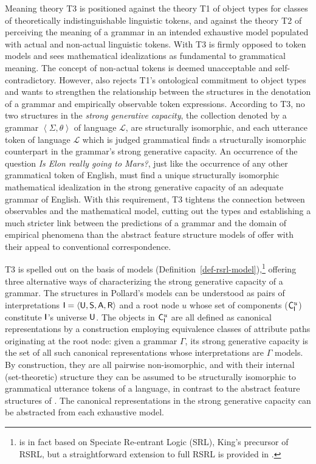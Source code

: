 \documentclass[output=paper
                ,modfonts
                ,nonflat
	        ,collection
	        ,collectionchapter
	        ,collectiontoclongg
 	        ,biblatex
                ,babelshorthands
                ,newtxmath
                ,draftmode
                ,colorlinks, citecolor=brown
]{./langsci/langscibook}
\begin{document}
{{Meaning theory T3 is positioned against the theory T1 of object types
for classes of theoretically indistinguishable linguistic tokens, and
against the theory T2 of perceiving the meaning of a grammar in an
intended exhaustive model populated with actual and non-actual
linguistic tokens.  With T3 \cite{Pollard99a} is firmly opposed to
token models and sees mathematical idealizations as fundamental to
grammatical meaning.  The concept of non-actual tokens is deemed
unacceptable and self-contradictory. However, \cite{Pollard99a} also
rejects T1's ontological commitment to object types and wants to
strengthen the relationship between the structures in the denotation
of a grammar and empirically observable token expressions.  According
to T3, no two structures in the \emph{strong generative capacity}, the
collection denoted by a grammar $\left< \Sigma, \theta\right>$ of
language $\mathcal{L}$, are
structurally isomorphic, and each utterance token of language
$\mathcal{L}$ which is judged grammatical finds a structurally
isomorphic counterpart in the grammar's strong generative capacity.
An occurrence of the question \emph{Is Elon really going to Mars?}, just
like the occurrence of any other grammatical token of English, must
find a unique structurally isomorphic mathematical idealization in the
strong generative capacity of an
adequate grammar of English. With this requirement, T3 tightens the
connection between observables and the mathematical model, cutting out
the types and establishing a much stricter link between the
predictions of a grammar and the domain of empirical phenomena than
the abstract feature structure models of \cite{PollardSag1994} offer
with their appeal to conventional correspondence.

T3 is spelled out on the basis of models
(Definition~\ref{def-rsrl-model}),\footnote{\cite{Pollard99a} is in
  fact based on Speciate Re-entrant Logic (SRL), King's precursor of
  RSRL, but a straightforward extension to full RSRL is provided in
  \cite{Richter2004a-u}.} offering three alternative ways of
characterizing the strong generative capacity of a grammar. The
structures in Pollard's models can be understood as pairs of
interpretations $\mathsf{I}=\langle\mathsf{U},\mathsf{S},\mathsf{A},\mathsf{R}\rangle$ and a root node $u$ whose set
of components ($\mathsf{C}_{\mathsf{I}}^u$) constitute $\mathsf{I}$'s universe
$\mathsf{U}$. The objects in $\mathsf{C}_{\mathsf{I}}^u$ are all defined as
canonical representations by a construction employing equivalence
classes of attribute paths originating at the root node: given a
grammar $\Gamma$, its strong generative capacity is the set of all
such canonical representations whose interpretations are $\Gamma$
models. By construction, they are all pairwise non-isomorphic, and
with their internal (set-theoretic) structure they can be assumed to
be structurally isomorphic to grammatical utterance tokens of a
language, in contrast to the abstract feature structures of
\cite{PollardSag1994}. The canonical representations in the strong
generative capacity can be abstracted from each exhaustive model.



}}
\end{document}
